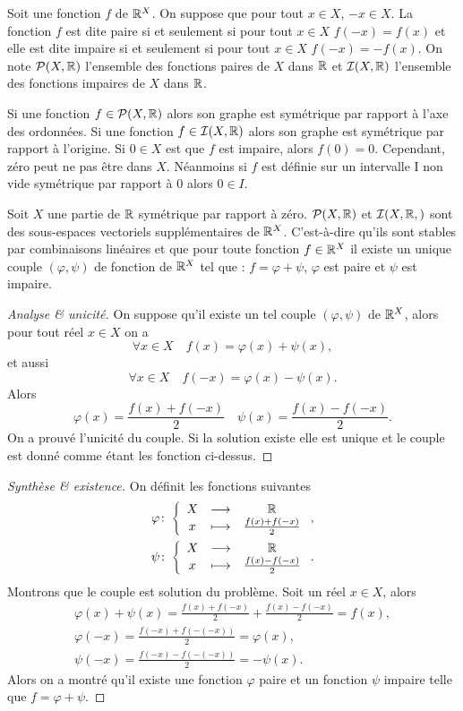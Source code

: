 \begin{defdef}
  Soit une fonction $f$ de $\mathbb{R}^X$. On suppose que pour tout $x \in X$, $-x \in X$. La fonction $f$ est dite paire si et seulement si pour tout $x \in X$ $f(-x)=f(x)$ et elle est dite impaire si et seulement si  pour tout $x \in X$ $f(-x)=-f(x)$. On note $\mathcal{P}(X,\mathbb{R})$ l'ensemble des fonctions paires de $X$ dans $\mathbb{R}$ et $\mathcal{I}(X,\mathbb{R})$ l'ensemble des fonctions impaires de $X$ dans $\mathbb{R}$.
\end{defdef}

Si une fonction $f \in \mathcal{P}(X,\mathbb{R})$ alors son graphe est symétrique par rapport à l'axe des ordonnées. Si une fonction $f \in \mathcal{I}(X,\mathbb{R})$ alors son graphe est symétrique par rapport à l'origine. Si $0 \in X$ est que $f$ est impaire, alors $f(0)=0$. Cependant, zéro peut ne pas être dans $X$. Néanmoins si $f$ est définie sur un intervalle I non vide symétrique par rapport à $0$ alors $0 \in I$.
\begin{prop}
  Soit $X$ une partie de $\mathbb{R}$ symétrique par rapport à zéro. $\mathcal{P}(X,\mathbb{R})$ et $\mathcal{I}(X,\mathbb{R},)$ sont des sous-espaces vectoriels supplémentaires de $\mathbb{R}^X$. C'est-à-dire qu'ils sont stables par combinaisons linéaires et que pour toute fonction $f \in \mathbb{R}^X$ il existe un unique couple $(\varphi, \psi)$ de fonction de $\mathbb{R}^X$ tel que : $f= \varphi+\psi$, $\varphi$ est paire et $\psi$ est impaire.
\end{prop}
\begin{proof}[Analyse \& unicité]
  On suppose qu'il existe un tel couple $(\varphi, \psi)$ de $\mathbb{R}^X$, alors pour tout réel $x \in X$ on a
  \begin{equation}
    \forall x \in X \quad f(x)= \varphi(x) + \psi(x),
  \end{equation}
  et aussi
  \begin{equation}
    \forall x \in X \quad f(-x)= \varphi(x) - \psi(x).
  \end{equation}
  Alors
  \begin{equation}
    \varphi(x)=\frac{f(x)+f(-x)}{2} \quad \psi(x)=\frac{f(x)-f(-x)}{2}.
  \end{equation}
  On a prouvé l'unicité du couple. Si la solution existe elle est unique et le couple est donné comme étant les fonction ci-dessus.
\end{proof}
\begin{proof}[Synthèse \& existence]
  On définit les fonctions suivantes
  \begin{gather}
    \varphi\colon \left\{\begin{array}{ccc} X & \longrightarrow &\mathbb{R}\\ x & \longmapsto & \frac{f(x)+f(-x)}{2} \end{array} \right., \\
    \psi\colon \left\{\begin{array}{ccc} X & \longrightarrow &\mathbb{R}\\ x & \longmapsto & \frac{f(x)-f(-x)}{2} \end{array} \right..
  \end{gather}
  Montrons que le couple est solution du problème. Soit un réel $x \in X$, alors
  \begin{gather}
    \varphi(x)+\psi(x)=\frac{f(x)+f(-x)}{2} + \frac{f(x)-f(-x)}{2} =f(x),\\
    \varphi(-x)=\frac{f(-x)+f(-(-x))}{2}=\varphi(x),\\
    \psi(-x)=\frac{f(-x)-f(-(-x))}{2}=-\psi(x).
  \end{gather}
  Alors on a montré qu'il existe une fonction $\varphi$ paire et un fonction $\psi$ impaire telle que $f=\varphi+\psi$.
\end{proof}

